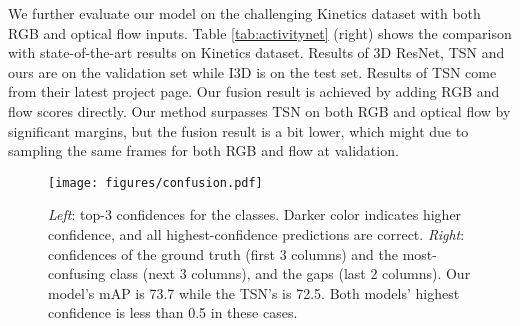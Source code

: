 \documentclass[runningheads]{llncs}
\begin{document}
We further evaluate our model on the challenging Kinetics dataset with both RGB and optical flow inputs. Table \ref{tab:activitynet} (right)  shows the comparison with state-of-the-art results on Kinetics dataset. Results of 3D ResNet, TSN and ours are on the validation set while I3D is on the test set. Results of TSN come from their latest project page. Our fusion result is achieved by adding RGB and flow scores directly. Our method surpasses TSN on both RGB and optical flow by significant margins, but the fusion result is a bit lower, which might due to sampling the same frames for both RGB and flow at validation. 

\begin{figure*}
\centering
\texttt{[image: figures/confusion.pdf]}
\caption{\textit{Left}: top-3 confidences for the classes. Darker color indicates higher confidence, and all highest-confidence predictions are correct. \textit{Right}: confidences of the ground truth (first 3 columns) and the most-confusing class (next 3 columns), and the gaps (last 2 columns). Our model's mAP is 73.7 while the TSN's is 72.5. Both models' highest confidence is less than 0.5 in these cases. }
\label{fig:confusion}
\end{figure*}
\end{document}
